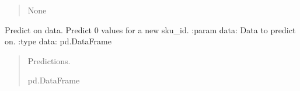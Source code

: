 \documentclass[letterpaper,10pt,english]{sphinxmanual}
\begin{document}
\begin{fulllineitems}
\begin{fulllineitems}
\begin{quote}
\begin{description}
\begin{itemize}
\end{itemize}

\sphinxAtStartPar
None

\end{description}\end{quote}

\end{fulllineitems}


\begin{fulllineitems}
\label{\detokenize{src_demand_forecast.models:src_demand_forecast.models.repro_experiments.MultiTargetModel.predict}}
\pysigstartsignatures
{}
\pysigstopsignatures
\sphinxAtStartPar
Predict on data.
Predict 0 values for a new sku\_id.
:param data: Data to predict on.
:type data: pd.DataFrame
\begin{quote}\begin{description}
\sphinxAtStartPar
Predictions.

\sphinxAtStartPar
pd.DataFrame

\end{description}\end{quote}

\end{fulllineitems}


\end{fulllineitems}

\end{document}
